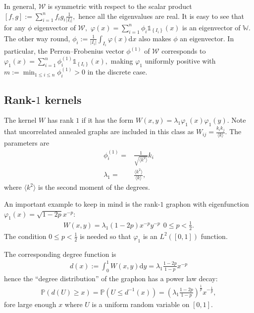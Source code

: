 \documentclass{article}
\newcommand{\pr}{\mathbb{P}}
\renewcommand{\d}{\mathrm{d}}
\newcommand{\W}{\mathbb{W}}
\newcommand{\1}[1]{{\mathds{1}}_{\left\{#1\right\}}}
\begin{document}
In general, $\mathcal{W}$ is symmetric with respect to the scalar product $[f,g]:=\sum_{i=1}^{n}f_i g_i \frac{1}{|I_i|},$ hence all the eigenvalues are real. It is easy to see that for any $\phi$ eigenvector of $\mathcal{W},$ $\varphi(x)=\sum_{i=1}^n \phi_i \1{I_i}(x)$ is an eigenvector of $\W.$ The other way round, $\phi_i:=\frac{1}{|I_i|}\int_{I_i} \varphi(x) \d x$ also makes $\phi$ an eigenvector. In particular, the Perron–Frobenius vector $\phi^{(1)}$ of $\mathcal{W}$ corresponds to $\varphi_1(x)=\sum_{i=1}^n \phi_i^{(1)} \1{I_i}(x),$ making $\varphi_1$ uniformly positive with $m:=\min_{1 \leq i \leq n} \phi_i^{(1)}>0$ in the discrete case.

\subsection{Rank-$1$ kernels}

The kernel $W$ has rank $1$ if it has the form $W(x,y)=\lambda_1 \varphi_1(x)\varphi_1(y).$ Note that uncorrelated annealed graphs are included in this class as $W_{ij}=\frac{k_i k_j}{\langle k \rangle} .$ The parameters are
\begin{align*}
\phi_i^{(1)}=&\frac{1}{\sqrt{\langle k^2 \rangle}}k_i\\
\lambda_1=& \frac{\langle k^2 \rangle}{\langle k \rangle },
\end{align*}
where $\langle k^2 \rangle$ is the second moment of the degrees.

An important example to keep in mind is the rank-$1$ graphon with eigenfunction $\varphi_1(x)=\sqrt{1-2p}x^{-p}:$
\begin{align}
\label{eq:powerlaw}
W(x,y)=\lambda_1 (1-2p)x^{-p}y^{-p} \ \ 0 \leq p < \frac{1}{2}.
\end{align}
The condition $0 \leq p < \frac{1}{2}$ is needed so that $\varphi_1$ is an $L^2\left( [0,1]\right)$ function. 

The corresponding degree function is
\begin{align*}
d(x):= \int_{0}^{1} W(x,y) \d y=\lambda_1 \frac{1-2p}{1-p}x^{-p}	
\end{align*}
hence the ``degree distribution'' of the graphon has a power law decay:
\begin{align*}
\pr\left(d(U) \geq x \right)= \pr \left( U \leq d^{-1}(x) \right)=\left(\lambda_1 \frac{1-2p}{1-p} \right)^{\frac{1}{p}}x^{-\frac{1}{p}},
\end{align*}
fore large enough $x$ where $U$ is a uniform random variable on $[0,1].$
\end{document}

